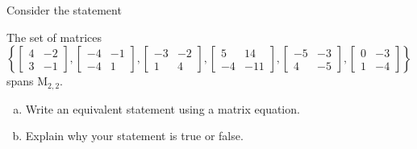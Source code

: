 
\begin{exerciseStatement}


Consider the statement 
\begin{center}\begin{minipage}{0.8\textwidth}
 The set of matrices \( \left\{ \left[\begin{array}{cc}
4 & -2 \\
3 & -1
\end{array}\right] , \left[\begin{array}{cc}
-4 & -1 \\
-4 & 1
\end{array}\right] , \left[\begin{array}{cc}
-3 & -2 \\
1 & 4
\end{array}\right] , \left[\begin{array}{cc}
5 & 14 \\
-4 & -11
\end{array}\right] , \left[\begin{array}{cc}
-5 & -3 \\
4 & -5
\end{array}\right] , \left[\begin{array}{cc}
0 & -3 \\
1 & -4
\end{array}\right] \right\} \) spans \(\mathrm{M}_{2,2}\). 
\end{minipage}\end{center}
    


\begin{enumerate}[(a)]
\item  Write an equivalent statement using a matrix equation.
\item  Explain why your statement is true or false.
\end{enumerate}
    
\end{exerciseStatement}
    
